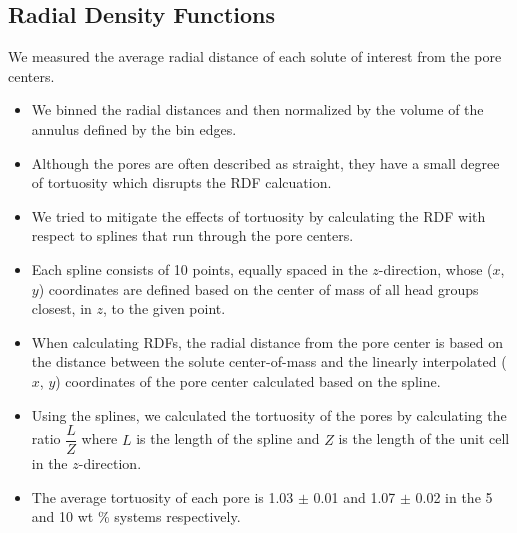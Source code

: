 \documentclass{article}
\begin{document}
  \subsection*{Radial Density Functions}\label{method:rdfs}
  We measured the average radial distance of each solute of interest from the pore
  centers.
  \begin{itemize}
	\item We binned the radial distances and then normalized by the volume
	of the annulus defined by the bin edges.
	\item Although the pores are often described as straight, they have a
	small degree of tortuosity which disrupts the RDF calcuation.
	\item We tried to mitigate the effects of tortuosity by calculating the RDF
	with respect to splines that run through the pore centers.
	\item Each spline consists of 10 points, equally spaced in the $z$-direction, whose
    ($x$, $y$) coordinates are defined based on the center of mass of all head
    groups closest, in $z$, to the given point.
	\item When calculating RDFs, the radial distance from the pore center
	is based on the distance between the solute center-of-mass and the linearly
	interpolated ($x$, $y$)	coordinates of the pore center calculated based
	on the spline.
	\item Using the splines, we calculated the tortuosity of the 
	pores by calculating the ratio $\dfrac{L}{Z}$ where $L$ is the length of the spline and $Z$ is 
    the length of the unit cell in the $z$-direction. 
    \item The average tortuosity of each pore is 1.03 $\pm$ 0.01 and 1.07 $\pm$ 0.02 in the 
    5 and 10 wt \% systems respectively. 
  \end{itemize}
  
\end{document}
